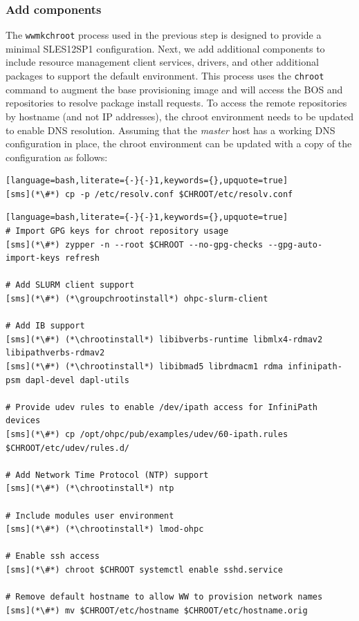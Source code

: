 \documentclass[letterpaper]{article}
\newcommand{\baseOS}{SLES12SP1}
\newcommand{\chrootinstall}{zypper -n --root \$CHROOT install}
\newcommand{\groupchrootinstall}{zypper -n --root \$CHROOT install -t pattern}
\begin{document}
\subsubsection{Add \OHPC{} components} \label{sec:add_components}

The \texttt{wwmkchroot} process used in the previous step is designed to
provide a minimal \baseOS{} configuration. Next, we add additional components to
include resource management client services, \InfiniBand{} drivers, and other
additional packages to support the default \OHPC{} environment. This process uses
the \texttt{chroot} command to augment the base provisioning image and will
access the BOS and \OHPC{} repositories to resolve package install requests. To
access the remote repositories by hostname (and not IP addresses), the chroot
environment needs to be updated to enable DNS resolution. Assuming that
the {\em master} host has a working DNS configuration in place, the chroot environment can
be updated with a copy of the configuration as follows:

\begin{lstlisting}[language=bash,literate={-}{-}1,keywords={},upquote=true]
[sms](*\#*) cp -p /etc/resolv.conf $CHROOT/etc/resolv.conf
\end{lstlisting}

\begin{lstlisting}[language=bash,literate={-}{-}1,keywords={},upquote=true]
# Import GPG keys for chroot repository usage
[sms](*\#*) zypper -n --root $CHROOT --no-gpg-checks --gpg-auto-import-keys refresh

# Add SLURM client support
[sms](*\#*) (*\groupchrootinstall*) ohpc-slurm-client

# Add IB support
[sms](*\#*) (*\chrootinstall*) libibverbs-runtime libmlx4-rdmav2 libipathverbs-rdmav2
[sms](*\#*) (*\chrootinstall*) libibmad5 librdmacm1 rdma infinipath-psm dapl-devel dapl-utils

# Provide udev rules to enable /dev/ipath access for InfiniPath devices
[sms](*\#*) cp /opt/ohpc/pub/examples/udev/60-ipath.rules $CHROOT/etc/udev/rules.d/

# Add Network Time Protocol (NTP) support
[sms](*\#*) (*\chrootinstall*) ntp

# Include modules user environment
[sms](*\#*) (*\chrootinstall*) lmod-ohpc

# Enable ssh access 
[sms](*\#*) chroot $CHROOT systemctl enable sshd.service

# Remove default hostname to allow WW to provision network names
[sms](*\#*) mv $CHROOT/etc/hostname $CHROOT/etc/hostname.orig
\end{lstlisting}
\end{document}
